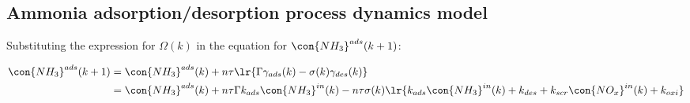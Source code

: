 
\subsection{Ammonia adsorption/desorption process dynamics model}
Substituting the expression for $\Omega(k)$ in the equation for
$\con{NH_3}^{ads}(k + 1)$:

\begin{align*}
    \con{NH_3}^{ads}(k + 1) &= \con{NH_3}^{ads} (k) + n \tau \lr{\Gamma \gamma_{ads} (k) - \sigma(k) \gamma_{des} (k)}\\
    &= \con{NH_3}^{ads}(k) + n \tau \Gamma k_{ads} \con{NH_3}^{in}(k) - n \tau \sigma(k) \lr{k_{ads} \con{NH_3}^{in}(k) + k_{des} + k_{scr} \con{NO_x}^{in}(k) + k_{oxi}}
\end{align*}


